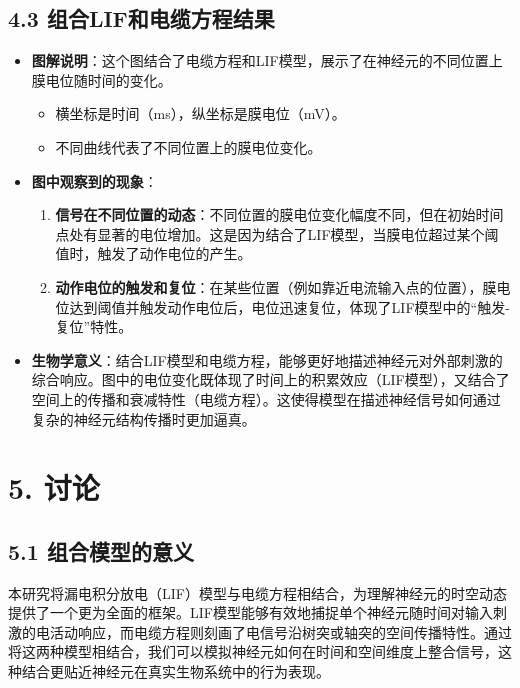 \documentclass[12pt]{article}
\begin{document}
\subsection*{4.3 组合LIF和电缆方程结果}

\begin{itemize}
    \item \textbf{图解说明}：这个图结合了电缆方程和LIF模型，展示了在神经元的不同位置上膜电位随时间的变化。
    \begin{itemize}
        \item 横坐标是时间（ms），纵坐标是膜电位（mV）。
        \item 不同曲线代表了不同位置上的膜电位变化。
    \end{itemize}
    \item \textbf{图中观察到的现象}：
    \begin{enumerate}
        \item \textbf{信号在不同位置的动态}：不同位置的膜电位变化幅度不同，但在初始时间点处有显著的电位增加。这是因为结合了LIF模型，当膜电位超过某个阈值时，触发了动作电位的产生。
        \item \textbf{动作电位的触发和复位}：在某些位置（例如靠近电流输入点的位置），膜电位达到阈值并触发动作电位后，电位迅速复位，体现了LIF模型中的“触发-复位”特性。
    \end{enumerate}
    \item \textbf{生物学意义}：结合LIF模型和电缆方程，能够更好地描述神经元对外部刺激的综合响应。图中的电位变化既体现了时间上的积累效应（LIF模型），又结合了空间上的传播和衰减特性（电缆方程）。这使得模型在描述神经信号如何通过复杂的神经元结构传播时更加逼真。
\end{itemize}


\section*{5. \textbf{讨论}}

\subsection*{5.1 组合模型的意义}

本研究将漏电积分放电（LIF）模型与电缆方程相结合，为理解神经元的时空动态提供了一个更为全面的框架。LIF模型能够有效地捕捉单个神经元随时间对输入刺激的电活动响应，而电缆方程则刻画了电信号沿树突或轴突的空间传播特性。通过将这两种模型相结合，我们可以模拟神经元如何在时间和空间维度上整合信号，这种结合更贴近神经元在真实生物系统中的行为表现。
\end{document}
